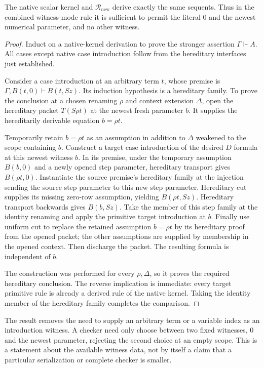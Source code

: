\begin{theorem}
The native scalar kernel and $\mathcal R_{\mathrm{new}}$ derive
exactly the same sequents.  Thus in the combined witness-mode rule it
is sufficient to permit the literal $0$ and the newest numerical
parameter, and no other witness.
\end{theorem}
\begin{proof}
Induct on a native-kernel derivation to prove the stronger assertion
$\Gamma\Vdash A$.  All cases except native case introduction follow
from the hereditary interfaces just established.

Consider a case introduction at an arbitrary term $t$, whose premise
is $\Gamma,B(t,0)\vdash B(t,Sz)$.  Its induction hypothesis is a
hereditary family.  To prove the conclusion at a chosen renaming
$\rho$ and context extension $\Delta$, open the hereditary packet
$T(S\rho t)$ at the newest fresh parameter $b$.  It supplies the
hereditarily derivable equation $b=\rho t$.

Temporarily retain $b=\rho t$ as an assumption in addition to
$\Delta$ weakened to the scope containing $b$.  Construct a target
case introduction of the desired $D$ formula at this newest witness
$b$.  In its premise, under the temporary assumption $B(b,0)$ and a
newly opened step parameter, hereditary
transport gives $B(\rho t,0)$.  Instantiate the source premise's
hereditary family at the injection sending the source step parameter
to this new step parameter.  Hereditary cut supplies its missing
zero-row assumption, yielding $B(\rho t,Sz)$.  Hereditary transport
backwards gives $B(b,Sz)$.  Take the member of this step family at the
identity renaming and apply the primitive target introduction at $b$.
Finally use uniform cut to replace the retained assumption
$b=\rho t$ by its hereditary proof from the opened packet; the other
assumptions are supplied by membership in the opened context.  Then
discharge the packet.  The resulting formula is independent of
$b$.

The construction was performed for every $\rho,\Delta$, so it proves
the required hereditary conclusion.  The reverse implication is
immediate: every target primitive rule is already a derived rule of
the native kernel.  Taking the identity member of the hereditary
family completes the comparison.
\end{proof}

The result removes the need to supply an arbitrary term or a variable
index as an introduction witness.  A checker need only choose between
two fixed witnesses, $0$ and the newest parameter, rejecting the
second choice at an empty scope.  This is a statement about the
available witness data, not by itself a claim that a particular
serialization or complete checker is smaller.

